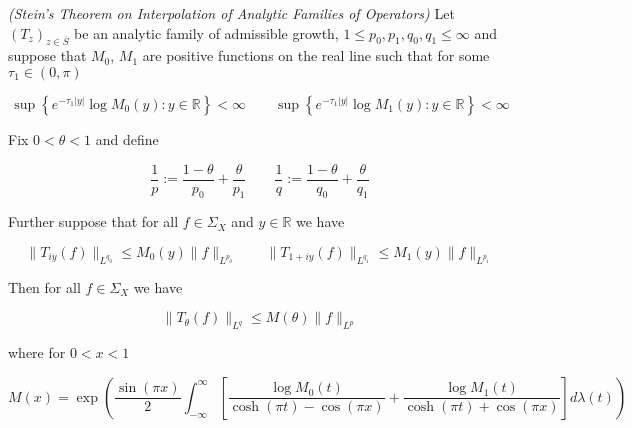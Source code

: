 \vspace{2mm}

\begin{mdframed}
	\begin{theorem}\emph{(Stein's Theorem on Interpolation of Analytic Families of Operators)}
		Let $\left( T_z \right)_{z \in \overline{S}}$ be an analytic family of admissible growth, $1 \leqslant p_0,p_1,q_0,q_1 \leqslant \infty$ and suppose that $M_0$, $M_1$ are positive functions on the real line such that for some $\tau_1 \in (0,\pi)$

			\begin{equation}
				\sup\left\{e^{-\tau_1 \vert y \vert} \log M_0(y) : y \in \mathbb{R}\right\} < \infty \qquad \sup\left\{e^{-\tau_1 \vert y \vert} \log M_1(y) : y \in \mathbb{R}\right\} < \infty
			\end{equation}

			Fix $0 < \theta < 1$ and define

			\begin{equation}
				\frac{1}{p} := \frac{1 - \theta}{p_0} + \frac{\theta}{p_1} \qquad \frac{1}{q} := \frac{1 - \theta}{q_0} + \frac{\theta}{q_1}
			\end{equation}

			Further suppose that for all $f \in \Sigma_X$ and $y \in \mathbb{R}$ we have

			\begin{equation}
				\|T_{iy}(f)\|_{L^{q_0}} \leqslant M_0(y)\|f\|_{L^{p_0}} \qquad \|T_{1 + iy}(f)\|_{L^{q_1}} \leqslant M_1(y)\|f\|_{L^{p_1}} 
			\end{equation}

			Then for all $f \in \Sigma_X$ we have

			\begin{equation*}
				\|T_\theta(f)\|_{L^q} \leqslant M(\theta)\|f\|_{L^p}
			\end{equation*}

			where for $0 < x < 1$

			\begin{equation*}
				M(x) = \exp\left( \frac{\sin(\pi x)}{2} \int_{-\infty}^\infty \left[ \frac{\log M_0(t)}{\cosh(\pi t) - \cos(\pi x)} + \frac{\log M_1(t)}{\cosh(\pi t) + \cos(\pi x)}\right] d\lambda(t) \right)
			\end{equation*}
	\end{theorem}
\end{mdframed}

\vspace{2mm}

